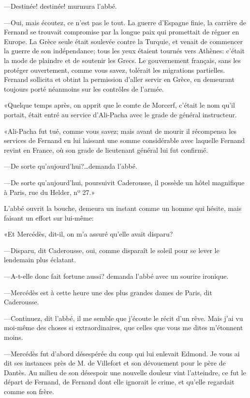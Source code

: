 —Destinée! destinée! murmura l'abbé.

—Oui, mais écoutez, ce n'est pas le tout. La guerre d'Espagne finie, la carrière de Fernand se trouvait compromise par la longue paix qui promettait de régner en Europe. La Grèce seule était soulevée contre la Turquie, et venait de commencer la guerre de son indépendance; tous les yeux étaient tournés vers Athènes: c'était la mode de plaindre et de soutenir les Grecs. Le gouvernement français, sans les protéger ouvertement, comme vous savez, tolérait les migrations partielles. Fernand sollicita et obtint la permission d'aller servir en Grèce, en demeurant toujours porté néanmoins sur les contrôles de l'armée.

«Quelque temps après, on apprit que le comte de Morcerf, c'était le nom qu'il portait, était entré au service d'Ali-Pacha avec le grade de général instructeur.

«Ali-Pacha fut tué, comme vous savez; mais avant de mourir il récompensa les services de Fernand en lui laissant une somme considérable avec laquelle Fernand revint en France, où son grade de lieutenant général lui fut confirmé.

—De sorte qu'aujourd'hui?\dots demanda l'abbé.

—De sorte qu'aujourd'hui, poursuivit Caderousse, il possède un hôtel magnifique à Paris, rue du Helder, nº 27.»

L'abbé ouvrit la bouche, demeura un instant comme un homme qui hésite, mais faisant un effort sur lui-même:

«Et Mercédès, dit-il, on m'a assuré qu'elle avait disparu?

—Disparu, dit Caderousse, oui, comme disparaît le soleil pour se lever le lendemain plus éclatant.

—A-t-elle donc fait fortune aussi? demanda l'abbé avec un sourire ironique.

—Mercédès est à cette heure une des plus grandes dames de Paris, dit Caderousse.

—Continuez, dit l'abbé, il me semble que j'écoute le récit d'un rêve. Mais j'ai vu moi-même des choses si extraordinaires, que celles que vous me dites m'étonnent moins.

—Mercédès fut d'abord désespérée du coup qui lui enlevait Edmond. Je vous ai dit ses instances près de M. de Villefort et son dévouement pour le père de Dantès. Au milieu de son désespoir une nouvelle douleur vint l'atteindre, ce fut le départ de Fernand, de Fernand dont elle ignorait le crime, et qu'elle regardait comme son frère.


